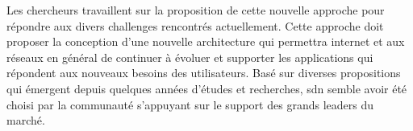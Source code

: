

Les chercheurs travaillent sur la proposition de cette nouvelle approche pour répondre aux divers challenges rencontrés actuellement. 
Cette approche doit proposer la conception d'une nouvelle architecture qui permettra internet et aux réseaux en général de continuer à évoluer et supporter les applications qui répondent aux nouveaux besoins des utilisateurs. 
Basé sur diverses propositions qui émergent depuis quelques années d'études et recherches, \gls{sdn} semble avoir été choisi par la communauté s'appuyant sur le support des grands leaders du marché.  \cite{SurveySDNIntro}


